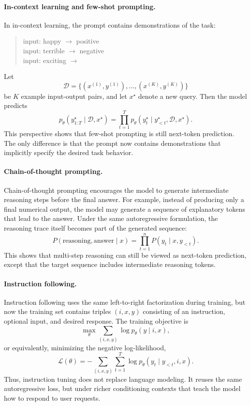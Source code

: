\documentclass{article}
\begin{document}
\paragraph{In-context learning and few-shot prompting.}
In in-context learning, the prompt contains demonstrations of the task:
\begin{quote}
input: happy $\rightarrow$ positive \\
input: terrible $\rightarrow$ negative \\
input: exciting $\rightarrow$
\end{quote}
Let
\[
\mathcal{D}=\{(x^{(1)},y^{(1)}),\dots,(x^{(K)},y^{(K)})\}
\]
be $K$ example input-output pairs, and let $x^{\star}$ denote a new query. Then the model predicts
\begin{equation}
    p_\theta(y^{\star}_{1:T}\mid \mathcal{D},x^{\star})=\prod_{t=1}^{T} p_\theta(y^{\star}_t\mid y^{\star}_{<t},\mathcal{D},x^{\star}).
\end{equation}
This perspective shows that few-shot prompting is still next-token prediction. The only difference is that the prompt now contains demonstrations that implicitly specify the desired task behavior.

\paragraph{Chain-of-thought prompting.}
Chain-of-thought prompting encourages the model to generate intermediate reasoning steps before the final answer. For example, instead of producing only a final numerical output, the model may generate a sequence of explanatory tokens that lead to the answer. Under the same autoregressive formulation, the reasoning trace itself becomes part of the generated sequence:
\[
P(\text{reasoning}, \text{answer} \mid x)
=
\prod_{t=1}^{n} P(y_t \mid x, y_{<t}).
\]
This shows that multi-step reasoning can still be viewed as next-token prediction, except that the target sequence includes intermediate reasoning tokens.

\paragraph{Instruction following.}
Instruction following uses the same left-to-right factorization during training, but now the training set contains triples $(i,x,y)$ consisting of an instruction, optional input, and desired response. The training objective is
\begin{equation}
    \max_{\theta} \sum_{(i,x,y)} \log p_\theta(y\mid i,x),
\end{equation}
or equivalently, minimizing the negative log-likelihood,
\begin{equation}
    \mathcal{L}(\theta)=-\sum_{(i,x,y)}\sum_{t=1}^{T} \log p_\theta(y_t\mid y_{<t},i,x).
\end{equation}
Thus, instruction tuning does not replace language modeling. It reuses the same autoregressive loss, but under richer conditioning contexts that teach the model how to respond to user requests.
\end{document}
